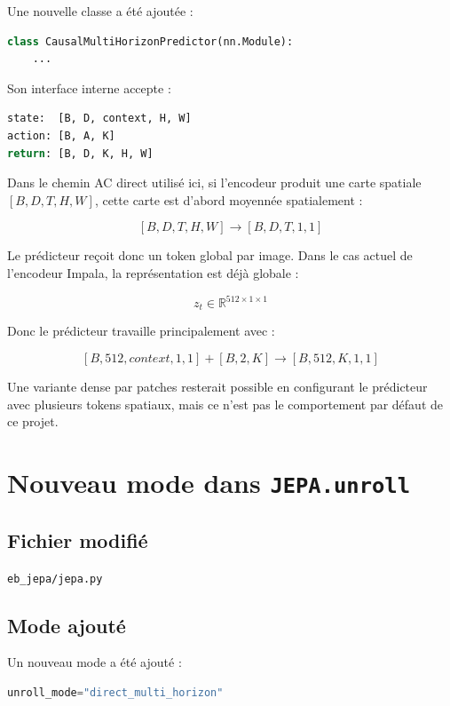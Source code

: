 \documentclass[11pt,a4paper]{article}
\newcommand{\filepath}[1]{\texttt{#1}}
\newcommand{\code}[1]{\texttt{#1}}
\begin{document}
Une nouvelle classe a été ajoutée :

\begin{lstlisting}[language=Python]
class CausalMultiHorizonPredictor(nn.Module):
    ...
\end{lstlisting}

Son interface interne accepte :

\begin{lstlisting}[language=Python]
state:  [B, D, context, H, W]
action: [B, A, K]
return: [B, D, K, H, W]
\end{lstlisting}

Dans le chemin AC direct utilisé ici, si l'encodeur produit une carte spatiale
\([B,D,T,H,W]\), cette carte est d'abord moyennée spatialement :

\[
[B,D,T,H,W] \rightarrow [B,D,T,1,1]
\]

Le prédicteur reçoit donc un token global par image. Dans le cas actuel de l'encodeur
Impala, la représentation est déjà globale :

\[
z_t \in \mathbb{R}^{512 \times 1 \times 1}
\]

Donc le prédicteur travaille principalement avec :

\[
[B, 512, context, 1, 1] + [B, 2, K]
\rightarrow
[B, 512, K, 1, 1]
\]

Une variante dense par patches resterait possible en configurant le prédicteur avec
plusieurs tokens spatiaux, mais ce n'est pas le comportement par défaut de ce projet.

\section{Nouveau mode dans \code{JEPA.unroll}}

\subsection{Fichier modifié}

\filepath{eb\_jepa/jepa.py}

\subsection{Mode ajouté}

Un nouveau mode a été ajouté :

\begin{lstlisting}[language=Python]
unroll_mode="direct_multi_horizon"
\end{lstlisting}
\end{document}
